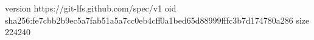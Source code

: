 version https://git-lfs.github.com/spec/v1
oid sha256:fe7cbb2b9ec5a7fab51a5a7cc0eb4cff0a1bed65d88999fffc3b7d174780a286
size 224240

